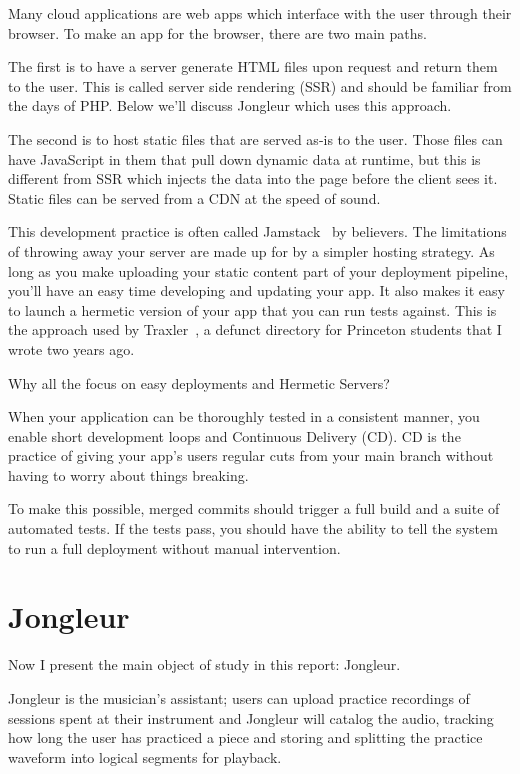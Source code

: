 \documentclass{article}
\newcommand{\infobox}[2]{
  \begin{tcolorbox}[width=\textwidth,colback={white},title={\strut\textbf{#1}},colbacktitle=blue!15,coltitle=black,boxrule=0.2pt,parbox=false]
    #2
  \end{tcolorbox}
}
\begin{document}
Many cloud applications are web apps which interface with the user through their browser.
To make an app for the browser, there are two main paths.

The first is to have a server generate HTML files upon request and return them to the user.
This is called server side rendering (SSR) and should be familiar from the days of PHP.
Below we'll discuss Jongleur which uses this approach.

The second is to host static files that are served as-is to the user.
Those files can have JavaScript in them that pull down dynamic data at runtime, but this is different from SSR which injects the data into the page before the client sees it.
Static files can be served from a CDN at the speed of sound.

This development practice is often called Jamstack~\cite{jamstack} by believers.
The limitations of throwing away your server are made up for by a simpler hosting strategy.
As long as you make uploading your static content part of your deployment pipeline, you'll have an easy time developing and updating your app.
It also makes it easy to launch a hermetic version of your app that you can run tests against.
This is the approach used by Traxler~\cite{traxler}, a defunct directory for Princeton students that I wrote two years ago.

\infobox{Continuous delivery}{
  Why all the focus on easy deployments and Hermetic Servers?
  
  When your application can be thoroughly tested in a consistent manner, you enable short development loops and Continuous Delivery (CD).
  CD is the practice of giving your app's users regular cuts from your main branch without having to worry about things breaking.

  To make this possible, merged commits should trigger a full build and a suite of automated tests.
  If the tests pass, you should have the ability to tell the system to run a full deployment without manual intervention.
}

\section{Jongleur}
\label{JONG}

Now I present the main object of study in this report: Jongleur.

Jongleur is the musician's assistant; users can upload practice recordings of sessions spent at their instrument and Jongleur will catalog the audio, tracking how long the user has practiced a piece and storing and splitting the practice waveform into logical segments for playback.
\end{document}
